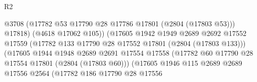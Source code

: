 \begin{lexlean}{R2}
\begin{coremodule}
                                            @3708
                                            (@17782
                                              @53
                                              @17790
                                              @28
                                              @17786
                                              @17801
                                              (@2804 (@17803 @53)))
                                            @17818)
                                          (@4618 @17062 @105))
                                        (@17605
                                          @1942
                                          @1949
                                          @2689
                                          @2692
                                          @17552
                                          @17559
                                          (@17782
                                            @133
                                            @17790
                                            @28
                                            @17552
                                            @17801
                                            (@2804 (@17803 @133)))
                                          (@17605
                                            @1944
                                            @1948
                                            @2689
                                            @2691
                                            @17554
                                            @17558
                                            (@17782
                                              @60
                                              @17790
                                              @28
                                              @17554
                                              @17801
                                              (@2804 (@17803 @60)))
                                            (@17605
                                              @1946
                                              @115
                                              @2689
                                              @2689
                                              @17556
                                              @2564
                                              (@17782
                                                @186
                                                @17790
                                                @28
                                                @17556

\end{coremodule}
\end{lexlean}
